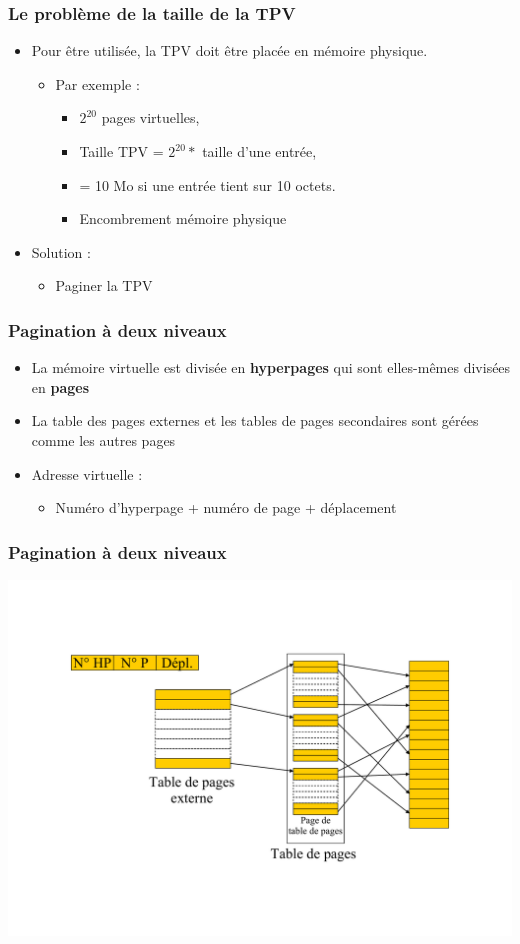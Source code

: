 \begin{frame}
\frametitle{Le problème de la taille de la TPV}
\begin{itemize}
\item Pour être utilisée, la TPV doit être placée en mémoire physique.
\begin{itemize}
\item Par exemple :
\begin{itemize}
\item $2^{20}$ pages virtuelles,
\item Taille TPV = $2^{20} * $ taille d'une entrée,
\item = 10 Mo si une entrée tient sur 10 octets.
\item Encombrement mémoire physique
\end{itemize}
\end{itemize}
\item Solution :
\begin{itemize}
\item Paginer la TPV
\end{itemize}
\end{itemize}
\end{frame}

\begin{frame}
\frametitle{Pagination à deux niveaux}
\begin{itemize}
\item La mémoire virtuelle est divisée en \textbf{hyperpages} qui sont elles-mêmes divisées en \textbf{pages}
\item La table des pages externes et les tables de pages secondaires sont gérées comme les autres pages
\item Adresse virtuelle :
\begin{itemize}
\item Numéro d'hyperpage + numéro de page + déplacement
\end{itemize}
\end{itemize}
\end{frame}


\begin{frame}
\frametitle{Pagination à deux niveaux}
\includegraphics[width=\textwidth]{../illustration/pagination_2_niveaux.pdf}
\end{frame}


